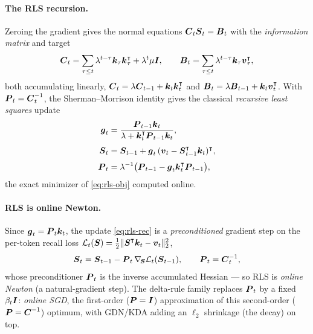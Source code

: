 \documentclass{article} %
\begin{document}
\paragraph{The RLS recursion.}
Zeroing the gradient gives the normal equations $\boldsymbol{C}_t \boldsymbol{S}_t = \boldsymbol{B}_t$ with the \emph{information
matrix} and target
\begin{equation}
  \boldsymbol{C}_t = \sum_{\tau\le t}\lambda^{t-\tau}\boldsymbol{k}_\tau \boldsymbol{k}_\tau^{\intercal}
  + \lambda^{t}\mu \boldsymbol{I},
  \qquad
  \boldsymbol{B}_t = \sum_{\tau\le t}\lambda^{t-\tau}\boldsymbol{k}_\tau \boldsymbol{v}_\tau^{\intercal},
  \label{eq:rls-info}
\end{equation}
both accumulating linearly, $\boldsymbol{C}_t=\lambda \boldsymbol{C}_{t-1}+\boldsymbol{k}_t \boldsymbol{k}_t^{\intercal}$ and
$\boldsymbol{B}_t=\lambda \boldsymbol{B}_{t-1}+\boldsymbol{k}_t \boldsymbol{v}_t^{\intercal}$. With $\boldsymbol{P}_t=\boldsymbol{C}_t^{-1}$, the Sherman--Morrison identity gives
the classical \emph{recursive least squares} update
\begin{equation}
\begin{aligned}
  \boldsymbol{g}_t &= \frac{\boldsymbol{P}_{t-1}\boldsymbol{k}_t}
  {\lambda+\boldsymbol{k}_t^{\intercal}\boldsymbol{P}_{t-1}\boldsymbol{k}_t}, \\[3pt]
  \boldsymbol{S}_t &= \boldsymbol{S}_{t-1}+\boldsymbol{g}_t\,
  (\boldsymbol{v}_t-\boldsymbol{S}_{t-1}^{\intercal}\boldsymbol{k}_t)^{\intercal}, \\[3pt]
  \boldsymbol{P}_t &= \lambda^{-1}\big(\boldsymbol{P}_{t-1}-\boldsymbol{g}_t \boldsymbol{k}_t^{\intercal}\boldsymbol{P}_{t-1}\big),
\end{aligned}
\label{eq:rls-rec}
\end{equation}
the exact minimizer of \eqref{eq:rls-obj} computed online.

\paragraph{RLS is online Newton.}
Since $\boldsymbol{g}_t=\boldsymbol{P}_t \boldsymbol{k}_t$, the update \eqref{eq:rls-rec} is a \emph{preconditioned} gradient step on
the per-token recall loss $\mathcal L_t(\boldsymbol{S})=\tfrac12\|\boldsymbol{S}^{\intercal}\boldsymbol{k}_t-\boldsymbol{v}_t\|_2^2$,
\begin{equation}
  \boldsymbol{S}_t = \boldsymbol{S}_{t-1} - \boldsymbol{P}_t\,\nabla_{\!\boldsymbol{S}}\mathcal L_t(\boldsymbol{S}_{t-1}),
  \qquad \boldsymbol{P}_t = \boldsymbol{C}_t^{-1},
  \label{eq:rls-newton}
\end{equation}
whose preconditioner $\boldsymbol{P}_t$ is the inverse accumulated Hessian --- so RLS is \emph{online
Newton} (a natural-gradient step). The delta-rule family replaces $\boldsymbol{P}_t$ by a fixed
$\beta_t \boldsymbol{I}$: \emph{online SGD}, the first-order ($\boldsymbol{P}=\boldsymbol{I}$) approximation of this second-order
($\boldsymbol{P}=\boldsymbol{C}^{-1}$) optimum, with GDN/KDA adding an $\ell_2$ shrinkage (the decay) on top.
\end{document}
